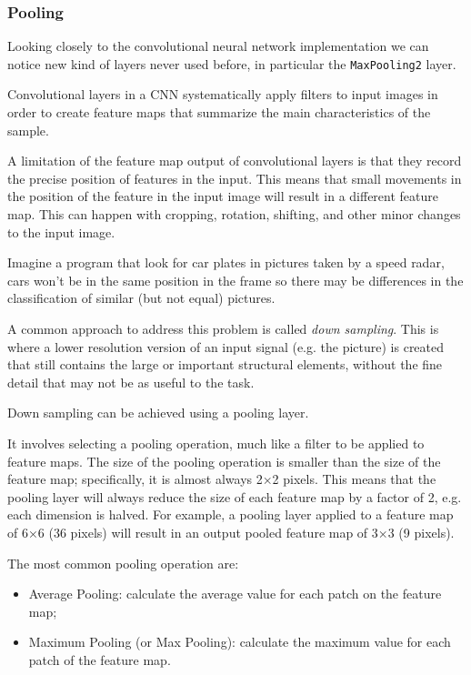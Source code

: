 \begin{attention}
\subsubsection{Pooling}

Looking closely to the convolutional neural network implementation we can notice new kind of layers never used before, in particular the \texttt{MaxPooling2} layer.

Convolutional layers in a CNN systematically apply filters to input images in order to create feature maps that summarize the main characteristics of the sample.

A limitation of the feature map output of convolutional layers is that they record the precise position of features in the input. This means that small movements in the position of the feature in the input image will result in a different feature map. This can happen with cropping, rotation, shifting, and other minor changes to the input image.

Imagine a program that look for car plates in pictures taken by a speed radar, cars won't be in the same position in the frame so there may be differences in the classification of similar (but not equal) pictures.

A common approach to address this problem is called \emph{down sampling}. 
This is where a lower resolution version of an input signal (e.g. the picture) is created that still contains the large or important structural elements, without the fine detail that may not be as useful to the task.

Down sampling can be achieved using a pooling layer.

It involves selecting a pooling operation, much like a filter to be applied to feature maps. The size of the pooling operation is smaller than the size of the feature map; specifically, it is almost always 2×2 pixels. This means that the pooling layer will always reduce the size of each feature map by a factor of 2, e.g. each dimension is halved. For example, a pooling layer applied to a feature map of 6×6 (36 pixels) will result in an output pooled feature map of 3×3 (9 pixels).

The most common pooling operation are:
\begin{itemize}
	\tightlist
	\item Average Pooling: calculate the
	average value for each patch on the feature map;
	\item Maximum Pooling (or Max Pooling): calculate the maximum value for each patch of the feature
	map.
\end{itemize}
\end{attention}

